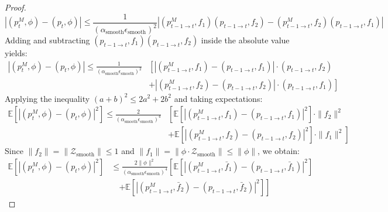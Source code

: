 \documentclass[11pt,a4paper]{report}
\begin{document}
\begin{proof}
\begin{equation}
    \left| (p_t^M, \phi) - (p_t, \phi) \right| \le \frac{1}{(\alpha_{\text{smooth}} \epsilon_{\text{smooth}})^2} \left| (p_{t-1 \to t}^M, f_1)(p_{t-1 \to t}, f_2) - (p_{t-1 \to t}^M, f_2)(p_{t-1 \to t}, f_1) \right|
\end{equation}
Adding and subtracting $(p_{t-1 \to t}, f_1)(p_{t-1 \to t}, f_2)$ inside the absolute value yields:
\begin{equation}
\begin{split}
    \left| (p_t^M, \phi) - (p_t, \phi) \right| \le \frac{1}{(\alpha_{\text{smooth}} \epsilon_{\text{smooth}})^2} & \left[ \left| (p_{t-1 \to t}^M, f_1) - (p_{t-1 \to t}, f_1) \right| \cdot (p_{t-1 \to t}, f_2) \right. \\
    & \left. + \left| (p_{t-1 \to t}^M, f_2) - (p_{t-1 \to t}, f_2) \right| \cdot (p_{t-1 \to t}, f_1) \right]
\end{split}
\end{equation}
Applying the inequality $(a+b)^2 \le 2a^2 + 2b^2$ and taking expectations:
\begin{equation}
\begin{split}
    \mathbb{E}\left[ \left| (p_t^M, \phi) - (p_t, \phi) \right|^2 \right] \le \frac{2}{(\alpha_{\text{smooth}} \epsilon_{\text{smooth}})^4} & \left[ \mathbb{E}\left[ \left| (p_{t-1 \to t}^M, f_1) - (p_{t-1 \to t}, f_1) \right|^2 \right] \cdot \parallel f_2 \parallel^2 \right. \\
    & \left. + \mathbb{E}\left[ \left| (p_{t-1 \to t}^M, f_2) - (p_{t-1 \to t}, f_2) \right|^2 \right] \cdot \parallel f_1 \parallel^2 \right]
\end{split}
\end{equation}
Since $\parallel f_2 \parallel = \parallel \mathcal{Z}_{\text{smooth}} \parallel \le 1$ and $\parallel f_1 \parallel = \parallel \phi \cdot \mathcal{Z}_{\text{smooth}} \parallel \le \parallel \phi \parallel$, we obtain:
\begin{equation}
    \begin{split}
        \mathbb{E}\left[ \left| (p_t^M, \phi) - (p_t, \phi) \right|^2 \right] &\le \frac{2 \parallel \phi \parallel^2}{(\alpha_{\text{smooth}} \epsilon_{\text{smooth}})^4} \left[ \mathbb{E}\left[ \left| (p_{t-1 \to t}^M, \bar{f}_1) - (p_{t-1 \to t}, \bar{f}_1) \right|^2 \right] \right. \\
        &\quad \left. + \mathbb{E}\left[ \left| (p_{t-1 \to t}^M, \bar{f}_2) - (p_{t-1 \to t}, \bar{f}_2) \right|^2 \right] \right]
    \end{split}

\end{equation}
\end{proof}
\end{document}
